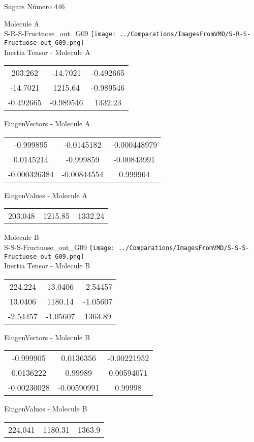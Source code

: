 \vtab[-2cm]
\begin{center}
{\large Sugars \tab Número 446}
\end{center}
\begin{multicols}{2}
\begin{center}

Molecule A \\ 
S-R-S-Fructuose\_out\_G09
\texttt{[image: ../Comparations/ImagesFromVMD/S-R-S-Fructuose\_out\_G09.png]}
\\
Inertia Tensor - Molecule A \\
\vtab

\begin{tabular}{|c c c|}
203.262	 & 	-14.7021	 & 	-0.492665	 \\
-14.7021	 & 	1215.64	 & 	-0.989546	 \\
-0.492665	 & 	-0.989546	 & 	1332.23
\end{tabular}

\vtab
 EingenVectors - Molecule A     \\
\vtab
\begin{tabular}{|c c c|}
-0.999895	 & 	-0.0145182	 & 	-0.000448979	 \\
0.0145214	 & 	-0.999859	 & 	-0.00843991	 \\
-0.000326384	 & 	-0.00844554	 & 	0.999964
\end{tabular}

\vtab
 EingenValues - Molecule A     \\
\vtab
\begin{tabular}{|c c c|}
203.048	 & 	1215.85	 & 	1332.24	 \\
\end{tabular}
\columnbreak

Molecule B \\ 
S-S-S-Fructuose\_out\_G09
\texttt{[image: ../Comparations/ImagesFromVMD/S-S-S-Fructuose\_out\_G09.png]}
\\
Inertia Tensor - Molecule B \\
\vtab

\begin{tabular}{|c c c|}
224.224	 & 	13.0406	 & 	-2.54457	 \\
13.0406	 & 	1180.14	 & 	-1.05607	 \\
-2.54457	 & 	-1.05607	 & 	1363.89
\end{tabular}

\vtab
 EingenVectors - Molecule B     \\
\vtab
\begin{tabular}{|c c c|}
-0.999905	 & 	0.0136356	 & 	-0.00221952	 \\
0.0136222	 & 	0.99989	 & 	0.00594071	 \\
-0.00230028	 & 	-0.00590991	 & 	0.99998
\end{tabular}

\vtab
 EingenValues - Molecule B     \\
\vtab
\begin{tabular}{|c c c|}
224.041	 & 	1180.31	 & 	1363.9	 \\
\end{tabular}

\end{center}
\end{multicols}
